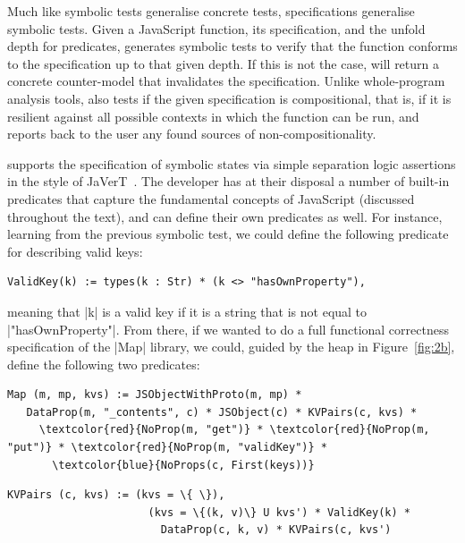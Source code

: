 Much like symbolic tests generalise concrete tests, specifications generalise symbolic tests. Given a JavaScript function, its specification, and the unfold depth for predicates, \cosette generates symbolic tests to verify that the function conforms to the specification up to that given depth. If this is not the case, \cosette will return a concrete counter-model that invalidates the specification. Unlike whole-program analysis tools, \cosette also tests if the given specification is compositional, that is, if it is resilient against all possible contexts in which the function can be run, and reports back to the user any found sources of non-compositionality.

\cosette supports the specification of symbolic states via simple separation logic assertions in the style of JaVerT~\cite{javert}. The developer has at their disposal a number of built-in predicates that capture the fundamental concepts of JavaScript (discussed throughout the text), and can define their own predicates as well. For instance, learning from the previous symbolic test, we could define the following predicate for describing valid keys:
\begin{Verbatim}[fontsize=\footnotesize,commandchars=\\\{\}]
    ValidKey(k) := types(k : Str) * (k <> "hasOwnProperty"),
\end{Verbatim}
\noindent meaning that \jsinline|k| is a valid key if it is a string that is not equal to \jsinline|"hasOwnProperty"|. From there, if we wanted to do a full functional correctness specification of the \jsinline|Map| library, we could, guided by the heap in Figure~\ref{fig:2b}, define the following two predicates:


\smallskip
\begin{Verbatim}[fontsize=\footnotesize,commandchars=\\\{\}]
 Map (m, mp, kvs) := JSObjectWithProto(m, mp) * 
   DataProp(m, "_contents", c) * JSObject(c) * KVPairs(c, kvs) * 
     \textcolor{red}{NoProp(m, "get")} * \textcolor{red}{NoProp(m, "put")} * \textcolor{red}{NoProp(m, "validKey")} * 
       \textcolor{blue}{NoProps(c, First(keys))}
\end{Verbatim}
\begin{Verbatim}[fontsize=\footnotesize,commandchars=\\\{\}]
  KVPairs (c, kvs) := (kvs = \{ \}),
                      (kvs = \{(k, v)\} U kvs') * ValidKey(k) * 
                        DataProp(c, k, v) * KVPairs(c, kvs')
\end{Verbatim}

